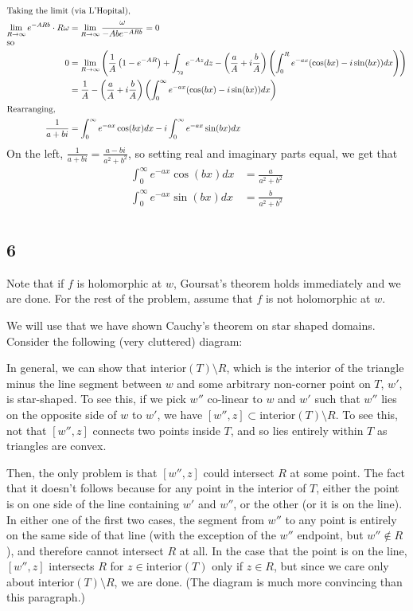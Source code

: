 \documentclass[12pt,letterpaper]{article}
\theoremstyle{definition}
\newcommand{\incfig}[1]{}
\begin{document}
\begin{align*}
  \intertext{Taking the limit (via L'Hopital),}
  \lim_{R \rightarrow\infty}e^{-ARb} \cdot R\omega &= \lim_{R \rightarrow\infty}\frac{\omega}{-Abe^{-ARb}} = 0 \\
  \intertext{so}
  0 &= \lim_{R \rightarrow\infty}\left(\frac{1}{A}\left(1 - e^{-AR}\right) + \int_{\gamma_{2}}e^{-Az}dz - \left(\frac{a}{A} + i\frac{b}{A}\right)\left(\int_{0}^{R}e^{-ax}(\cos(bx) - i\sin(bx))dx\right)\right) \\
  &= \frac{1}{A} - \left(\frac{a}{A} + i\frac{b}{A}\right)\left(\int_{0}^{\infty}e^{-ax}(\cos(bx) - i\sin(bx))dx\right) \\
  \intertext{Rearranging,}
  \frac{1}{a+bi} &= \int_{0}^{\infty}e^{-ax}\cos(bx)dx - i\int_{0}^{\infty}e^{-ax}\sin(bx)dx \\
\end{align*}
On the left, $\frac{1}{a+bi} = \frac{a-bi}{a^{2}+b^{2}}$, so setting real and imaginary parts equal, we get that
\begin{align*}
  \int_{0}^{\infty}e^{-ax}\cos(bx)dx &= \frac{a}{a^{2}+b^{2}} \\
  \int_{0}^{\infty}e^{-ax}\sin(bx)dx &= \frac{b}{a^{2}+b^{2}} \\
\end{align*}

\subsection*{6}

Note that if $f$ is holomorphic at $w$, Goursat's theorem holds immediately and we are done. For the rest of the problem, assume that $f$ is not holomorphic at $w$.

We will use that we have shown Cauchy's theorem on star shaped domains. Consider the following (very cluttered) diagram:
\begin{figure}[H]
  \centering
  \incfig{path3}
\end{figure}

In general, we can show that $\text{interior}(T) \setminus R$, which is the interior of the triangle minus the line segment between $w$ and some arbitrary non-corner point on $T$, $w'$, is star-shaped. To see this, if we pick $w''$ co-linear to $w$ and $w'$ such that $w''$ lies on the opposite side of $w$ to $w'$, we have $[w'', z] \subset \text{interior}(T) \setminus R$. To see this, not that $[w'', z]$ connects two points inside $T$, and so lies entirely within $T$ as triangles are convex.

Then, the only problem is that $[w'',z]$ could intersect $R$ at some point. The fact that it doesn't follows because for any point in the interior of $T$, either the point is on one side of the line containing $w'$ and $w''$, or the other (or it is on the line). In either one of the first two cases, the segment from $w''$ to any point is entirely on the same side of that line (with the exception of the $w''$ endpoint, but $w'' \notin R$), and therefore cannot intersect $R$ at all. In the case that the point is on the line, $[w'', z]$ intersects $R$ for $z \in \text{interior}(T)$ only if $z \in R$, but since we care only about $\text{interior}(T) \setminus R$, we are done. (The diagram is much more convincing than this paragraph.)
\end{document}
